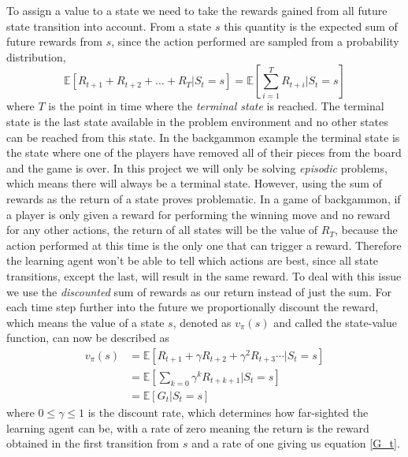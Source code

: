 \documentclass[11pt]{article}
\begin{document}
To assign a value to a state we need to take the rewards
gained from all future state transition into account.
From a state $s$ this quantity is the expected sum of
future rewards from $s$, since the action performed are
sampled from a probability distribution,
\begin{equation}\label{G_t}
    \mathds{E}[R_{t+1} + R_{t+2} + \hdots + R_{T} | S_t = s] = \mathds{E}[\sum\limits_{i = 1}^T R_{t+i} | S_t = s]
\end{equation}
where $T$ is the point in time where the \textit{terminal state} is reached.
The terminal state is the last state available in the problem environment and
no other states can be reached from this state.
In the backgammon example the terminal state is the state where one of the players
have removed all of their pieces from the board and the game is over.
In this project we will only be solving \textit{episodic} problems, which
means there will always be a terminal state.
However, using the sum of rewards as the return of a state proves problematic.
In a game of backgammon, if a player is only given a reward for performing the winning move
and no reward for any other actions, the return of all states will be
the value of $R_T$, because the action performed at this time is the only one
that can trigger a reward.
Therefore the learning agent won't be able to tell which actions are best,
since all state transitions, except the last, will result in the same reward.
To deal with this issue we use the \textit{discounted} sum of rewards as our return instead
of just the sum.
For each time step further into the future
we proportionally discount the reward, which means the value
of a state $s$, denoted as $v_\pi(s)$ and called the state-value function, can now be described as
\begin{equation}\label{gammaG_t}
    \begin{aligned}
        v_\pi(s) &= \mathds{E}[R_{t+1} + \gamma R_{t+2} + \gamma^2 R_{t+3} \cdots | S_t = s]\\
        &= \mathds{E}[ \sum\limits_{k = 0} \gamma^k R_{t+k+1} | S_t = s]\\
        &= \mathds{E}[ G_t | S_t = s]
    \end{aligned}
\end{equation}
where $ 0 \leq \gamma \leq 1$ is the discount rate, which determines how far-sighted the learning agent can be,
with a rate of zero meaning the return is the reward obtained in the first transition from $s$ and a rate of
one giving us equation \ref{G_t}.
\end{document}
